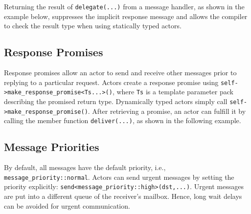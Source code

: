 Returning the result of \lstinline^delegate(...)^ from a message handler, as
shown in the example below, suppresses the implicit response message and allows
the compiler to check the result type when using statically typed actors.


\subsection{Response Promises}
\label{promise}

Response promises allow an actor to send and receive other messages prior to
replying to a particular request. Actors create a response promise using
\lstinline^self->make_response_promise<Ts...>()^, where \lstinline^Ts^ is a
template parameter pack describing the promised return type. Dynamically typed
actors simply call \lstinline^self->make_response_promise()^. After retrieving
a promise, an actor can fulfill it by calling the member function
\lstinline^deliver(...)^, as shown in the following example.


\clearpage
\subsection{Message Priorities}

By default, all messages have the default priority, i.e.,
\lstinline^message_priority::normal^. Actors can send urgent messages by
setting the priority explicitly:
\lstinline^send<message_priority::high>(dst,...)^. Urgent messages are put into
a different queue of the receiver's mailbox. Hence, long wait delays can be
avoided for urgent communication.

